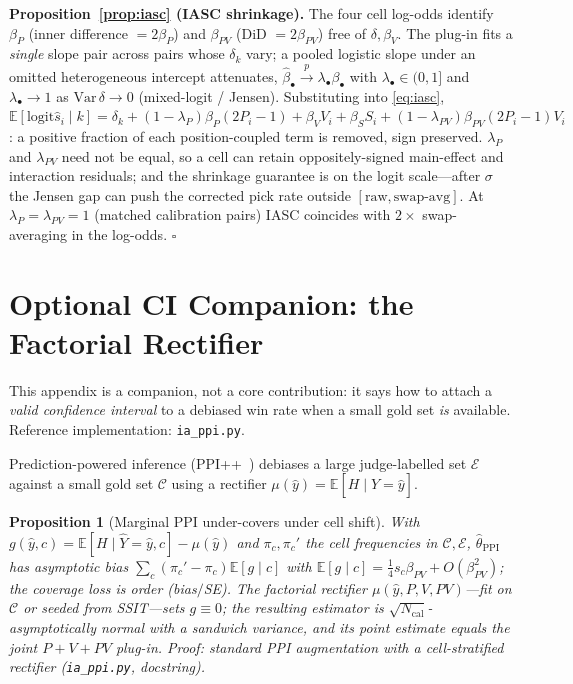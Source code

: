 \documentclass{article}
\newtheorem{proposition}{Proposition}
\newcommand{\logit}{\mathrm{logit}}
\newcommand{\Ncal}{N_{\mathrm{cal}}}
\newcommand{\E}{\mathbb{E}}
\begin{document}
\medskip
\noindent\textbf{Proposition~\ref{prop:iasc} (IASC shrinkage).}
The four cell log-odds identify $\beta_P$ (inner difference
$=2\beta_P$) and $\beta_{PV}$ (DiD $=2\beta_{PV}$) free of
$\delta,\beta_V$. The plug-in fits a \emph{single} slope pair across
pairs whose $\delta_k$ vary; a pooled logistic slope under an
omitted heterogeneous intercept attenuates,
$\hat\beta_\bullet\xrightarrow{p}\lambda_\bullet\beta_\bullet$ with
$\lambda_\bullet\in(0,1]$ and $\lambda_\bullet\to1$ as
$\mathrm{Var}\,\delta\to0$ (mixed-logit / Jensen). Substituting into
\eqref{eq:iasc},
$\E[\logit\hat s_i\mid k]=\delta_k
+(1{-}\lambda_P)\beta_P(2P_i{-}1)+\beta_V V_i+\beta_S S_i
+(1{-}\lambda_{PV})\beta_{PV}(2P_i{-}1)V_i$: a positive fraction of
each position-coupled term is removed, sign preserved.
$\lambda_P$ and $\lambda_{PV}$ need not be equal, so a cell can
retain oppositely-signed main-effect and interaction residuals; and
the shrinkage guarantee is on the logit scale---after $\sigma$ the
Jensen gap can push the corrected pick rate outside
$[\text{raw},\text{swap-avg}]$. At $\lambda_P=\lambda_{PV}=1$
(matched calibration pairs) IASC coincides with $2\times$
swap-averaging in the log-odds. \hfill$\square$

\section{Optional CI Companion: the Factorial Rectifier}
\label{app:coverage}
\label{app:iappi-est}
\label{app:valid}

This appendix is a companion, not a core contribution: it says how
to attach a \emph{valid confidence interval} to a debiased win rate
when a small gold set \emph{is} available. Reference implementation:
\texttt{ia\_ppi.py}.

Prediction-powered inference (PPI++~\cite{angelopoulos2024ppipp,
eif_judge2026}) debiases a large judge-labelled set $\mathcal{E}$
against a small gold set $\mathcal{C}$ using a rectifier
$\mu(\hat y)=\E[H\mid\hat Y{=}\hat y]$.

\begin{proposition}[Marginal PPI under-covers under cell shift]
\label{prop:coverage}
With $g(\hat y,c)=\E[H\mid\hat Y{=}\hat y,c]-\mu(\hat y)$ and
$\pi_c,\pi_c'$ the cell frequencies in $\mathcal{C},\mathcal{E}$,
$\hat\theta_{\mathrm{PPI}}$ has asymptotic bias
$\sum_c(\pi_c'-\pi_c)\E[g\mid c]$ with
$\E[g\mid c]=\tfrac14 s_c\beta_{PV}+O(\beta_{PV}^2)$; the coverage
loss is order (bias$/$SE). The \emph{factorial} rectifier
$\mu(\hat y,P,V,PV)$---fit on $\mathcal{C}$ or seeded from SSIT---sets
$g\equiv0$; the resulting estimator is $\sqrt{\Ncal}$-asymptotically
normal with a sandwich variance, and its point estimate equals the
joint $P{+}V{+}PV$ plug-in. Proof: standard PPI augmentation with a
cell-stratified rectifier (\texttt{ia\_ppi.py}, docstring).
\end{proposition}
\end{document}
